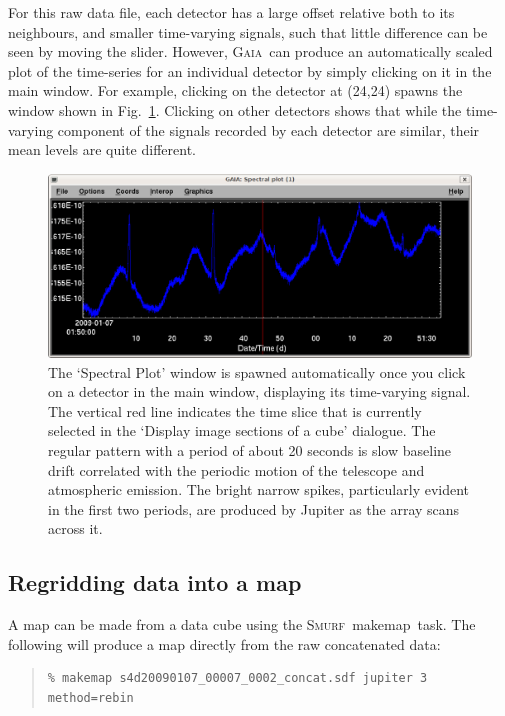 \documentclass[twoside,11pt]{article}
\newenvironment{myquote}{\begin{quote}\begin{small}}{\end{small}\end{quote}}
\newcommand{\gaia}{\xref{\textsc{Gaia}}{sun214}{}}
\newcommand{\smurf}{\xref{\textsc{Smurf}}{sun258}{}}
\newcommand{\task}[1]{\textsf{#1}}
\newcommand{\makemap}{\xref{\task{makemap}}{sun258}{MAKEMAP}}
\newcommand{\xref}[3]{#1}
\newcommand{\xlabel}[1]{}
\renewcommand{\_}{\texttt{\symbol{95}}}
\begin{document}
For this raw data file, each detector has a large offset relative both
to its neighbours, and smaller time-varying signals, such that little
difference can be seen by moving the slider. However, \gaia\ can
produce an automatically scaled plot of the time-series for an
individual detector by simply clicking on it in the main window. For
example, clicking on the detector at (24,24) spawns the window shown
in Fig.~\ref{fig:gaia_spec}. Clicking on other detectors shows that
while the time-varying component of the signals recorded by each
detector are similar, their mean levels are quite different.

\begin{figure}
\begin{center}
\includegraphics[width=0.7\linewidth]{gaia_spec.eps}
\caption{The `Spectral Plot' window is spawned automatically once you
  click on a detector in the main window, displaying its time-varying
  signal. The vertical red line indicates the time slice that is
  currently selected in the `Display image sections of a cube'
  dialogue. The regular pattern with a period of about 20 seconds is
  slow baseline drift correlated with the periodic motion of the
  telescope and atmospheric emission. The bright narrow spikes,
  particularly evident in the first two periods, are produced by
  Jupiter as the array scans across it.}
\label{fig:gaia_spec}
\end{center}
\end{figure}

\subsection{\xlabel{regrid_map}Regridding data into a map} 

A map can be made from a data cube using the \smurf\ \makemap\ task. The
following will produce a map directly from the raw concatenated data:

\begin{myquote}
\begin{verbatim}
% makemap s4d20090107_00007_0002_concat.sdf jupiter 3 method=rebin
\end{verbatim}
\end{myquote}
\end{document}
